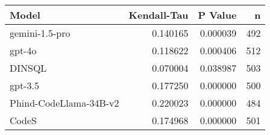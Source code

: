 \begin{tabular}{lrrr}
\toprule
Model & Kendall-Tau & P Value & n \\
\midrule
gemini-1.5-pro & 0.140165 & 0.000039 & 492 \\
gpt-4o & 0.118622 & 0.000406 & 512 \\
DINSQL & 0.070004 & 0.038987 & 503 \\
gpt-3.5 & 0.177250 & 0.000000 & 500 \\
Phind-CodeLlama-34B-v2 & 0.220023 & 0.000000 & 484 \\
CodeS & 0.174968 & 0.000000 & 501 \\
\bottomrule
\end{tabular}
